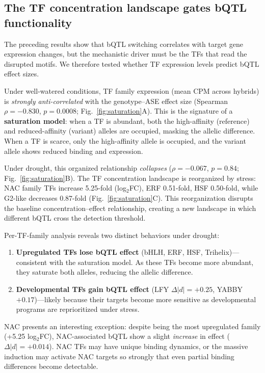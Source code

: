 \documentclass[10pt,letterpaper]{article}
\begin{document}
\subsection*{The TF concentration landscape gates bQTL functionality}

The preceding results show that bQTL switching correlates with target gene
expression changes, but the mechanistic driver must be the TFs that read the
disrupted motifs. We therefore tested whether TF expression levels predict
bQTL effect sizes.

Under well-watered conditions, TF family expression (mean CPM across hybrids)
is \emph{strongly anti-correlated} with the genotype--ASE effect size
(Spearman $\rho = -0.830$, $p = 0.0008$; Fig.~\ref{fig:saturation}A). This
is the signature of a \textbf{saturation model}: when a TF is abundant, both
the high-affinity (reference) and reduced-affinity (variant) alleles are
occupied, masking the allelic difference. When a TF is scarce, only the
high-affinity allele is occupied, and the variant allele shows reduced binding
and expression.

Under drought, this organized relationship \emph{collapses}
($\rho = -0.067$, $p = 0.84$; Fig.~\ref{fig:saturation}B). The TF
concentration landscape is reorganized by stress: NAC family TFs increase
5.25-fold (log$_2$FC), ERF 0.51-fold, HSF 0.50-fold, while G2-like decreases
0.87-fold (Fig.~\ref{fig:saturation}C). This reorganization
disrupts the baseline concentration--effect relationship, creating a new
landscape in which different bQTL cross the detection threshold.

Per-TF-family analysis reveals two distinct behaviors under drought:
\begin{enumerate}
  \item \textbf{Upregulated TFs lose bQTL effect} (bHLH, ERF, HSF,
    Trihelix)---consistent with the saturation model. As these TFs become
    more abundant, they saturate both alleles, reducing the allelic difference.
  \item \textbf{Developmental TFs gain bQTL effect} (LFY $\Delta|d| = +0.25$,
    YABBY $+0.17$)---likely because their targets become more sensitive as
    developmental programs are reprioritized under stress.
\end{enumerate}

NAC presents an interesting exception: despite being the most upregulated
family (+5.25 log$_2$FC), NAC-associated bQTL show a slight \emph{increase}
in effect ($\Delta|d| = +0.014$). NAC TFs may have unique binding dynamics,
or the massive induction may activate NAC targets so strongly that even
partial binding differences become detectable.
\end{document}
